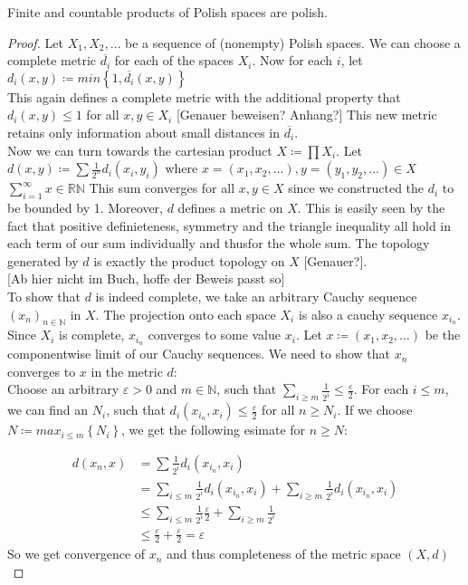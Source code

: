 \documentclass[10pt, a4paper, titlepage]{article}
\numberwithin{equation}{section}
\begin{document}
\begin{lemma}
	\label{products}
	Finite and countable products of Polish spaces are polish.
\end{lemma}
\begin{proof}
	Let $X_1,X_2,\ldots$ be a sequence of (nonempty) Polish spaces. We can choose a complete metric $\overline{d_i}$ for each of the spaces $X_i$. 
	Now for each $i$, let $d_i \left( x,y \right) \coloneq min \left\{ 1,\overline{d_i} \left( x,y \right)  \right\}$\\
	This again defines a complete metric with the additional property that $d_i\left( x,y \right) \leq 1$ for all $x,y \in X_i$ [Genauer beweisen? Anhang?]
This new metric retains only information about small distances in $\overline{d_i}$.\\
Now we can turn towards the cartesian product $X \coloneq \prod X_i$.
Let $d\left( x,y \right)\coloneq \sum \frac{1}{2^{n}} d_i\left( x_{i},y_{i} \right)$
where $x = \left( x_1,x_2,\ldots \right), y = \left( y_1,y_2,\ldots \right) \in X$ 
$\sum_{i=1}^{\infty} x \in \mathbb{R} \mathbb{N}$
This sum converges for all $x,y \in X$ since we constructed the $d_i$ to be bounded by 1.
 Moreover, $d$ defines a metric on $X$. This is easily seen by the fact that positive definieteness, symmetry and the triangle inequality all hold in each term of our sum individually and thusfor the whole sum. 
 The topology generated by $d$ is exactly the product topology on $X$ [Genauer?].\\

[Ab hier nicht im Buch, hoffe der Beweis passt so] \\
To show that $d$ is indeed complete, we take an arbitrary Cauchy sequence $(x_{n})_{n \in  \mathbb{N}}$ in $X$. The projection onto each  space $X_i$ is also a cauchy sequence  $x_{i_n}$.
 Since $X_i$ is complete, $x_{i_n}$ converges to some value $x_i$. 
Let $x \coloneq \left( x_1,x_2,\ldots \right) $ be the componentwise limit of our Cauchy sequences. We need to show that $x_{n}$ converges to $x$ in the metric $d$:\\
Choose an arbitrary $\varepsilon > 0 $ and $m \in  \mathbb{N}$, such that $\sum_{i \geq m} \frac{1}{2^i} \leq \frac{\varepsilon}{2} $.
For each $i \leq m$, we can find an  $N_i$, such that $d_i\left( x_{i_n},x_i \right) \leq \frac{\varepsilon}{2}$ for all $n\geq N_i$. 
If we choose $N  \coloneq max_{i \leq m}\left\{ N_i \right\} $, we get the following esimate for $n \geq N$: 

\begin{align*}
	d\left( x_{n},x \right) &= \sum \frac{1}{2^i} d_i\left( x_{i_n},x_i \right)\\
				&= \sum_{i\leq m} \frac{1}{2^i} d_i\left( x_{i_n},x_i \right) + \sum_{i \geq m} \frac{1}{2^i} d_i\left( x_{i_n},x_i \right) \\
				&\leq \sum_{i \leq m} \frac{1}{2^i} \frac{\varepsilon}{2} + \sum_{i\geq m} \frac{1}{2^i} \\
				&\leq \frac{\varepsilon}{2} + \frac{\varepsilon}{2} = \varepsilon
\end{align*}
So we get convergence of $x_n$ and thus completeness of the metric space $\left( X,d \right) $ \\


\end{proof}
\end{document}
